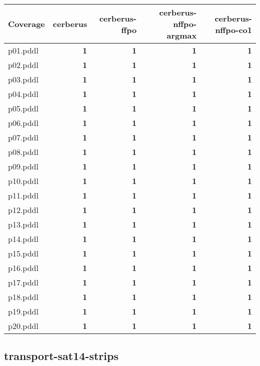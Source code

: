\documentclass{article}
\begin{document}
\begin{tabular}{@{}lrrrr@{}}
Coverage & cerberus & cerberus-ffpo & cerberus-nffpo-argmax & cerberus-nffpo-co1 \\
\midrule
p01.pddl & \textbf{1} & \textbf{1} & \textbf{1} & \textbf{1} \\
p02.pddl & \textbf{1} & \textbf{1} & \textbf{1} & \textbf{1} \\
p03.pddl & \textbf{1} & \textbf{1} & \textbf{1} & \textbf{1} \\
p04.pddl & \textbf{1} & \textbf{1} & \textbf{1} & \textbf{1} \\
p05.pddl & \textbf{1} & \textbf{1} & \textbf{1} & \textbf{1} \\
p06.pddl & \textbf{1} & \textbf{1} & \textbf{1} & \textbf{1} \\
p07.pddl & \textbf{1} & \textbf{1} & \textbf{1} & \textbf{1} \\
p08.pddl & \textbf{1} & \textbf{1} & \textbf{1} & \textbf{1} \\
p09.pddl & \textbf{1} & \textbf{1} & \textbf{1} & \textbf{1} \\
p10.pddl & \textbf{1} & \textbf{1} & \textbf{1} & \textbf{1} \\
p11.pddl & \textbf{1} & \textbf{1} & \textbf{1} & \textbf{1} \\
p12.pddl & \textbf{1} & \textbf{1} & \textbf{1} & \textbf{1} \\
p13.pddl & \textbf{1} & \textbf{1} & \textbf{1} & \textbf{1} \\
p14.pddl & \textbf{1} & \textbf{1} & \textbf{1} & \textbf{1} \\
p15.pddl & \textbf{1} & \textbf{1} & \textbf{1} & \textbf{1} \\
p16.pddl & \textbf{1} & \textbf{1} & \textbf{1} & \textbf{1} \\
p17.pddl & \textbf{1} & \textbf{1} & \textbf{1} & \textbf{1} \\
p18.pddl & \textbf{1} & \textbf{1} & \textbf{1} & \textbf{1} \\
p19.pddl & \textbf{1} & \textbf{1} & \textbf{1} & \textbf{1} \\
p20.pddl & \textbf{1} & \textbf{1} & \textbf{1} & \textbf{1} \\
\end{tabular}

\hypertarget{coverage-transport-sat14-strips}{}
\subsection*{transport-sat14-strips}
\end{document}
